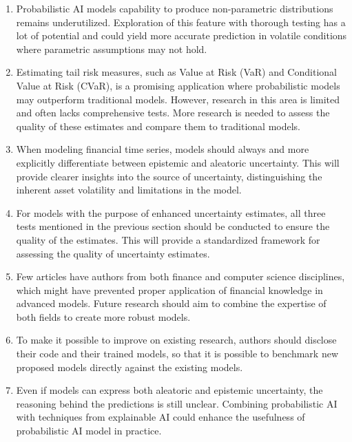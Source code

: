 \begin{enumerate}
    \item Probabilistic AI models capability to produce non-parametric distributions remains underutilized. Exploration of this feature with thorough testing has a lot of potential and could yield more accurate prediction in volatile conditions where parametric assumptions may not hold.
    \item Estimating tail risk measures, such as Value at Risk (VaR) and Conditional Value at Risk (CVaR), is a promising application where probabilistic models may outperform traditional models. However, research in this area is limited and often lacks comprehensive tests. More research is needed to assess the quality of these estimates and compare them to traditional models.
    \item When modeling financial time series, models should always and more explicitly differentiate between epistemic and aleatoric uncertainty. This will provide clearer insights into the source of uncertainty, distinguishing the inherent asset volatility and limitations in the model.
    \item For models with the purpose of enhanced uncertainty estimates, all three tests mentioned in the previous section should be conducted to ensure the quality of the estimates. This will provide a standardized framework for assessing the quality of uncertainty estimates.
    \item Few articles have authors from both finance and computer science disciplines, which might have prevented proper application of financial knowledge in advanced models. Future research should aim to combine the expertise of both fields to create more robust models.
    \item To make it possible to improve on existing research, authors should disclose their code and their trained models, so that it is possible to benchmark new proposed models directly against the existing models.
    \item Even if models can express both aleatoric and epistemic uncertainty, the reasoning behind the predictions is still unclear. Combining probabilistic AI with techniques from explainable AI could enhance the usefulness of probabilistic AI model in practice.
\end{enumerate}




